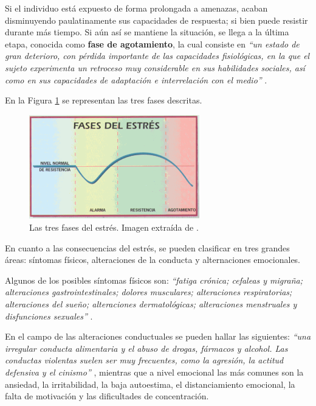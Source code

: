         Si el individuo está expuesto de forma prolongada a amenazas, acaban disminuyendo paulatinamente sus capacidades de respuesta; si bien puede resistir durante más tiempo. Si aún así se mantiene la situación, se llega a la última etapa, conocida como \textbf{fase de agotamiento}, la cual consiste en \textit{``un estado de gran deterioro, con pérdida importante de las capacidades fisiológicas, en la que el sujeto experimenta un retroceso muy considerable en sus habilidades sociales, así como en sus capacidades de adaptación e interrelación con el medio''} \cite{torrades_estres_2007}. 
        
        En la Figura \ref{figure:marco_teorico:fases_estres} se representan las tres fases descritas.

        \begin{figure}[h]
            \centering
            \includegraphics[width=0.66\textwidth]{figures/fases_estres.png}
            \caption[Las tres fases del estrés]
            {Las tres fases del estrés. Imagen extraída de \cite{nutricionprofesional_fases_2014}.}
            \label{figure:marco_teorico:fases_estres}
        \end{figure}

        En cuanto a las consecuencias del estrés, se pueden clasificar en tres grandes áreas: síntomas físicos, alteraciones de la conducta y alternaciones emocionales.

        Algunos de los posibles síntomas físicos son: \textit{``fatiga crónica; cefaleas y migraña; alteraciones gastrointestinales; dolores musculares; alteraciones respiratorias; alteraciones del sueño; alteraciones dermatológicas; alteraciones menstruales y disfunciones sexuales''} \cite{torrades_estres_2007}.

        En el campo de las alteraciones conductuales se pueden hallar las siguientes:
        \textit{``una irregular conducta alimentaria y el abuso de drogas, fármacos y alcohol. Las conductas violentas suelen ser muy frecuentes, como la agresión, la actitud defensiva y el cinismo''} \cite{torrades_estres_2007}, mientras que a nivel emocional las más comunes son la ansiedad, la irritabilidad, la baja autoestima, el distanciamiento emocional, la falta de motivación y las dificultades de concentración.


